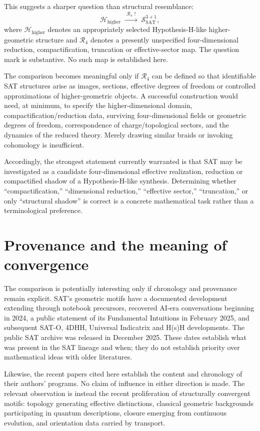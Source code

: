 \documentclass[11pt]{article}
\begin{document}
This suggests a sharper question than structural resemblance:
\begin{equation}
\mathcal H_{\mathrm{higher}}\;\xrightarrow{\;\mathcal R_{4}\;?\;}\;\mathcal S_{\mathrm{SAT}}^{3+1},
\end{equation}
where $\mathcal H_{\mathrm{higher}}$ denotes an appropriately selected Hypothesis-H-like higher-geometric structure and $\mathcal R_4$ denotes a presently unspecified four-dimensional reduction, compactification, truncation or effective-sector map. The question mark is substantive. No such map is established here.

The comparison becomes meaningful only if $\mathcal R_4$ can be defined so that identifiable SAT structures arise as images, sections, effective degrees of freedom or controlled approximations of higher-geometric objects. A successful construction would need, at minimum, to specify the higher-dimensional domain, compactification/reduction data, surviving four-dimensional fields or geometric degrees of freedom, correspondence of charge/topological sectors, and the dynamics of the reduced theory. Merely drawing similar braids or invoking cohomology is insufficient.

Accordingly, the strongest statement currently warranted is that SAT may be investigated as a candidate four-dimensional effective realization, reduction or compactified shadow of a Hypothesis-H-like synthesis. Determining whether ``compactification,'' ``dimensional reduction,'' ``effective sector,'' ``truncation,'' or only ``structural shadow'' is correct is a concrete mathematical task rather than a terminological preference.

\section{Provenance and the meaning of convergence}
The comparison is potentially interesting only if chronology and provenance remain explicit. SAT's geometric motifs have a documented development extending through notebook precursors, recovered AI-era conversations beginning in 2024, a public statement of its Fundamental Intuitions in February 2025, and subsequent SAT-O, 4DHH, Universal Indicatrix and H(s)H developments. The public SAT archive was released in December 2025. These dates establish what was present in the SAT lineage and when; they do not establish priority over mathematical ideas with older literatures.

Likewise, the recent papers cited here establish the content and chronology of their authors' programs. No claim of influence in either direction is made. The relevant observation is instead the recent proliferation of structurally convergent motifs: topology generating effective distinctions, classical geometric backgrounds participating in quantum descriptions, closure emerging from continuous evolution, and orientation data carried by transport.
\end{document}
